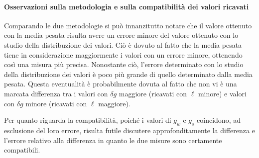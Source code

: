\paragraph{Osservazioni sulla metodologia e sulla compatibilità dei valori ricavati\\}

Comparando le due metodologie si può innanzitutto notare che il valore ottenuto con la media pesata risulta avere un errore minore del valore ottenuto con lo studio della distribuzione dei valori. Ciò è dovuto al fatto che la media pesata tiene in considerazione maggiormente i valori con un errore minore, ottenendo così una misura più precisa. Nonostante ciò, l'errore determinato con lo studio della distribuzione dei valori è poco più grande di quello determinato dalla media pesata. Questa eventualità è probabilmente dovuta al fatto che non vi è una marcata differenza tra i valori con $\delta g$ maggiore (ricavati con $\ell$ minore) e valori con $\delta g$ minore (ricavati con $\ell$ maggiore).

Per quanto riguarda la compatibilità, poiché i valori di $g_w$ e $g_s$ coincidono, ad esclusione del loro errore, risulta futile discutere approfonditamente la differenza e l'errore relativo alla differenza in quanto le due misure sono certamente compatibili.
